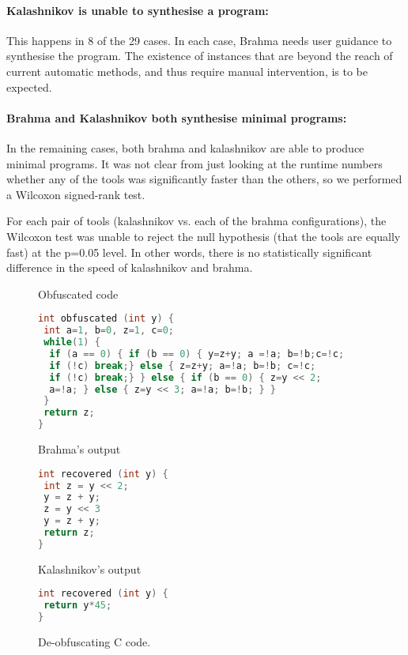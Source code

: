 \documentclass[a4paper]{llncs}
\begin{document}
\paragraph{\bf {\sc Kalashnikov} is unable to synthesise a program:}
This happens in 8 of the 29 cases.  In each case, {\sc Brahma} needs user guidance to synthesise the program.
The existence of instances that are beyond the reach of current automatic
methods, and thus require manual intervention, is to be expected.
\paragraph{\bf {\sc Brahma} and {\sc Kalashnikov} both synthesise minimal programs:}
In the remaining cases, both {\sc brahma} and {\sc kalashnikov} are able to produce
minimal programs.  It was not clear from just looking at the runtime numbers whether
any of the tools was significantly faster than the others, so we performed a Wilcoxon signed-rank test.

For each pair of tools ({\sc kalashnikov} vs. each of the {\sc brahma} configurations), the Wilcoxon test was
unable to reject the null hypothesis (that the tools are equally fast) at the p=0.05 level. In other words,
there is no statistically significant difference in the speed of {\sc kalashnikov} and {\sc brahma}.

\begin{figure}
Obfuscated code

\begin{lstlisting}[frame=single,language=c]
int obfuscated (int y) {
 int a=1, b=0, z=1, c=0;
 while(1) {
  if (a == 0) { if (b == 0) { y=z+y; a =!a; b=!b;c=!c;
  if (!c) break;} else { z=z+y; a=!a; b=!b; c=!c;
  if (!c) break;} } else { if (b == 0) { z=y << 2;
  a=!a; } else { z=y << 3; a=!a; b=!b; } }
 }
 return z;
}
\end{lstlisting}

\begin{minipage}[t]{.45\textwidth}
{\sc Brahma}'s output

\begin{lstlisting}[language=c,frame=single]
int recovered (int y) {
 int z = y << 2;
 y = z + y;
 z = y << 3
 y = z + y;
 return z;
}
\end{lstlisting}
\end{minipage}
\hfill
\begin{minipage}[t]{.45\textwidth}
{\sc Kalashnikov}'s output
 \begin{lstlisting}[language=c,frame=single]
int recovered (int y) {
 return y*45;
}
\end{lstlisting}
\end{minipage}

 \caption{De-obfuscating  C code.
  \label{fig:obfuscated}}
\end{figure}
\end{document}
